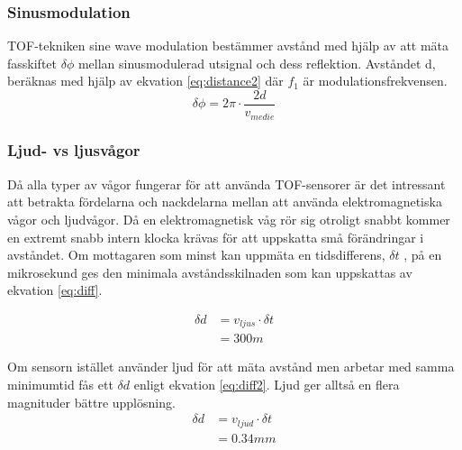 \documentclass[a4paper,12pt,fleqn]{article}
\begin{document}
\subsubsection{Sinusmodulation}
TOF-tekniken sine wave modulation bestämmer avstånd med hjälp av att mäta fasskiftet \begin{math}\delta\phi\end{math} mellan sinusmodulerad utsignal och dess reflektion. Avståndet d, beräknas med hjälp av ekvation \ref{eq:distance2} där \begin{math}f_1\end{math} är modulationsfrekvensen. 
\begin{equation}
\label{eq:distance2}
\delta\phi = 2\pi \cdot \frac{2d}{v_{medie}}
\end{equation}


\subsubsection{Ljud- vs ljusvågor}
Då alla typer av vågor fungerar för att använda TOF-sensorer är det intressant att betrakta fördelarna och nackdelarna mellan att använda elektromagnetiska vågor och ljudvågor.
Då en elektromagnetisk våg rör sig otroligt snabbt kommer en extremt snabb intern klocka krävas för att uppskatta små förändringar i avståndet. Om mottagaren som minst kan uppmäta en tidsdifferens, \begin{math}\delta t\end{math} , på en mikrosekund ges den minimala avståndsskilnaden som kan uppskattas av ekvation \ref{eq:diff}.

\begin{equation}
\label{eq:diff}
\begin{split}
\delta d & = v_{ljus}\cdot\delta t \\
& = 300 m
\end{split}
\end{equation}

Om sensorn istället använder ljud för att mäta avstånd men arbetar med samma minimumtid fås ett \begin{math}\delta d\end{math} enligt ekvation \ref{eq:diff2}.
Ljud ger alltså en flera magnituder bättre upplösning.
\begin{equation}
\label{eq:diff2}
\begin{split}
\delta d & = v_{ljud}\cdot\delta t \\
& = 0.34 mm
\end{split}
\end{equation}
\end{document}
